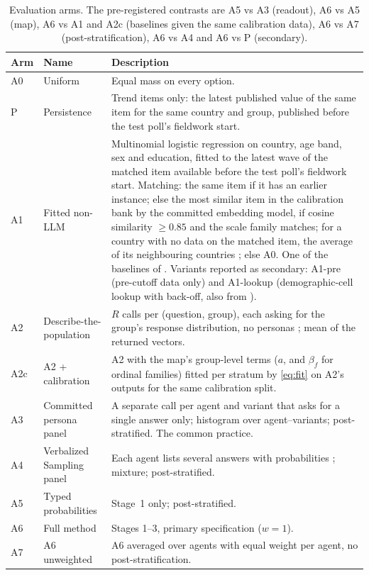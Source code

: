 \documentclass[11pt]{article}
\begin{document}
\begin{table}[t]
\centering
\small
\begin{tabular}{@{}lL{3.0cm}L{9.8cm}@{}}
\toprule
Arm & Name & Description \\
\midrule
A0 & Uniform & Equal mass on every option. \\
P & Persistence & Trend items only: the latest published value of the same item for the same country and group, published before the test poll's fieldwork start. \\
A1 & Fitted non-LLM & Multinomial logistic regression on country, age band, sex and education, fitted to the latest wave of the matched item available before the test poll's fieldwork start. Matching: the same item if it has an earlier instance; else the most similar item in the calibration bank by the committed embedding model, if cosine similarity $\ge0.85$ and the scale family matches; for a country with no data on the matched item, the average of its neighbouring countries \citep{wang2026ess}; else A0. One of the baselines of \citet{chen2026synthetic}. Variants reported as secondary: A1-pre (pre-cutoff data only) and A1-lookup (demographic-cell lookup with back-off, also from \citealp{chen2026synthetic}). \\
A2 & Describe-the-population & $R$ calls per (question, group), each asking for the group's response distribution, no personas \citep{jang2026cannot,doudkin2026marginal}; mean of the returned vectors. \\
A2c & A2 + calibration & A2 with the map's group-level terms ($a$, and $\beta_f$ for ordinal families) fitted per stratum by \eqref{eq:fit} on A2's outputs for the same calibration split. \\
A3 & Committed persona panel & A separate call per agent and variant that asks for a single answer only; histogram over agent--variants; post-stratified. The common practice. \\
A4 & Verbalized Sampling panel & Each agent lists several answers with probabilities \citep{zhang2025verbalized}; mixture; post-stratified. \\
A5 & Typed probabilities & Stage~1 only; post-stratified. \\
A6 & Full method & Stages 1--3, primary specification ($w=1$). \\
A7 & A6 unweighted & A6 averaged over agents with equal weight per agent, no post-stratification. \\
\bottomrule
\end{tabular}
\caption{Evaluation arms. The pre-registered contrasts are A5 vs A3 (readout), A6 vs A5 (map), A6 vs A1 and A2c (baselines given the same calibration data), A6 vs A7 (post-stratification), A6 vs A4 and A6 vs P (secondary).}
\label{tab:arms}
\end{table}
\end{document}
